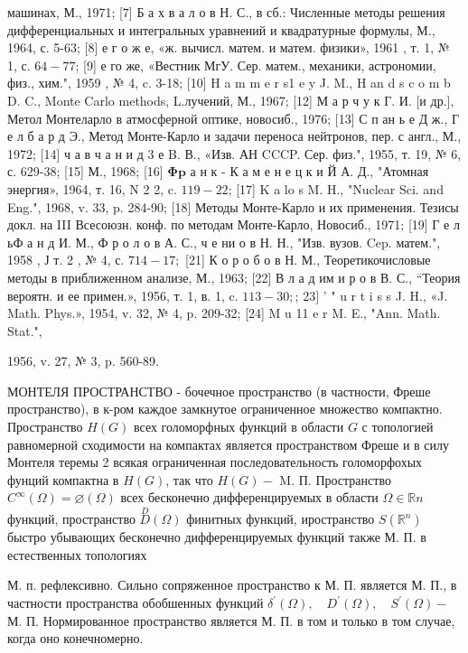 \documentclass[10pt]{article}
\begin{document}
машинах, М., 1971; [7] Б а х в а л о в Н. С., в сб.: Численные методы решения дифференциальных и интегральных уравнений и квадратурные формулы, М., 1964, с. 5-63; [8] е г о ж е, «ж. вычисл. матем. и матем. физики», 1961 , т. 1, № 1, с. $64-77$; [9] е го же, «Вестник МгУ. Сер. матем., механики, астрономии, физ., хим.", 1959 , № 4, c. 3-18; [10] H a m m e r s1 e y J. M., H an d s c o m b D. C., Monte Carlo methods, L.лучений, М., 1967; [12] М а р ч у к Г. И. [и др.], Метол Монтеларло в атмосферной оптике, новосиб., 1976; [13] С п ан ь е Д ж., Г е л б а р д Э., Метод Монте-Карло и задачи переноса нейтронов, пер. с англ., М., 1972; [14] ч а в ч а н и д 3 е B. В., «Изв. АН CCCP. Сер. физ.", 1955, т. 19, № 6, с. 629-38; [15] М., 1968; [16] $\mathbf{\Phi} \mathbf{p}$ а н к - К а м е н е ц к и Й А. Д., "Атомная энергия», 1964, т. 16, N 2 2, c. $119-22$; [17] K a lo s M. H., "Nuclear Sci. and Eng.", 1968, v. 33, p. 284-90; [18] Методы Монте-Карло и их применения. Тезисы докл. на III Всесоюзн. конф. по методам Монте-Карло, Новосиб., 1971; [19] Г е л ьФ а н д И. М., Ф р о л о в А. С., ч е ни о в Н. Н., "Изв. вузов. Cep. матем.", 1958 , Ј т. 2 , № 4, с. $714-17 ;$ [21] К о р о б о в Н. М., Теоретикочисловые методы в приближенном анализе, М., 1963; [22] В л а д им и р о в В. С., “Теория вероятн. и ее примен.», 1956, т. 1, в. 1, c. $113-30 ;$; 23$]$ ' " u r t i s s J. H., «J. Math. Phys.», 1954, v. 32, № 4, p. 209-32; [24] M u 11 e r M. E., "Ann. Math. Stat.",

1956, v. 27, № 3, p. 560-89.



МОНТЕЛЯ ПРОСТРАНСТВО - бочечное пространство (в частности, Фреше пространство), в к-ром каждое замкнутое ограниченное множество компактно. Пространство $H(G)$ всех голоморфных функций в области $G$ с топологией равномерной сходимости на компактах является пространством Фреше и в силу Монтеля теремы 2 всякая ограниченная последовательность голоморфохых фунций компактна в $H(G)$, так что $H(G)-$ M. П. Пространство $C^{\infty}(\Omega)=\varnothing(\Omega)$ всех бесконечно дифференцируемых в области $\Omega \in \mathbb{R} n$ функций, пространство $\stackrel{D}{D}(\Omega)$ финитных функций, иространство $S\left(\mathbb{R}^{n}\right)$ быстро убывающих бесконечно дифференцируемых функций также М. П. в естественных топологиях



М. п. рефлексивно. Сильно сопряженное пространство к М. П. является М. П., в частности пространства обобшенных функций $\delta^{\prime}(\Omega), \quad D^{\prime}(\Omega), \quad S^{\prime}(\Omega)-$ М. П. Нормированное пространство является М. П. в том и только в том случае, когда оно конечномерно.
\end{document}
